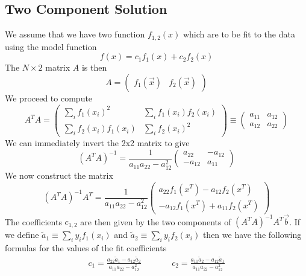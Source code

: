 \subsection{Two Component Solution}
We assume that we have two function $f_{1,2}(x)$ which are to be fit to the data using the model function
\begin{equation}
	f(x) = c_1 f_1(x) + c_2 f_2(x)
\end{equation}
The $N\times 2$ matrix $A$ is then
\begin{equation}
	A =
	\begin{pmatrix}
		f_1(\vec{x}) & f_2(\vec{x})
	\end{pmatrix}
\end{equation}
We proceed to compute
\begin{equation}
	A^T A =
	\begin{pmatrix}
		\sum_i f_1(x_i)^2 & \sum_i f_1(x_i)f_2(x_i) \\
		\sum_i f_2(x_i)f_1(x_i) & \sum_i f_2(x_i)^2
	\end{pmatrix}
	\equiv
	\begin{pmatrix}
		a_{11} & a_{12} \\
		a_{12} & a_{22}
	\end{pmatrix}
\end{equation}
We can immediately invert the 2x2 matrix to give
\begin{equation}
	\left(A^T A\right)^{-1} = 
	\frac{1}{a_{11} a_{22} - a_{12}^2}
	\begin{pmatrix}
		a_{22} & -a_{12} \\
		-a_{12} & a_{11}
	\end{pmatrix}
\end{equation}
We now construct the matrix
\begin{equation}
	\left(A^T A\right)^{-1} A^T = \frac{1}{a_{11} a_{22} - a_{12}^2}
	\begin{pmatrix}
		a_{22}f_1(x^T)  - a_{12}f_2(x^T) \\
		-a_{12}f_1(x^T) + a_{11}f_2(x^T)
	\end{pmatrix}
\end{equation}
The coefficients $c_{1,2}$ are then given by the two components of $\left(A^T A\right)^{-1} A^T \vec{b}$. If we define $\tilde{a}_1 \equiv \sum_i y_i f_1(x_i)$ and $\tilde{a}_2 \equiv \sum_i y_i f_2(x_i)$ then we have the following formulas for the values of the fit coefficients
\begin{align} \label{append_lsq_two_comp}
	c_1 = \frac{a_{22}\tilde{a}_1 - a_{12} \tilde{a}_2}{a_{11} a_{22} - a_{12}^2}
	&\qquad&
	c_2 = \frac{a_{11}\tilde{a}_2 - a_{12} \tilde{a}_1}{a_{11} a_{22} - a_{12}^2}
\end{align}

